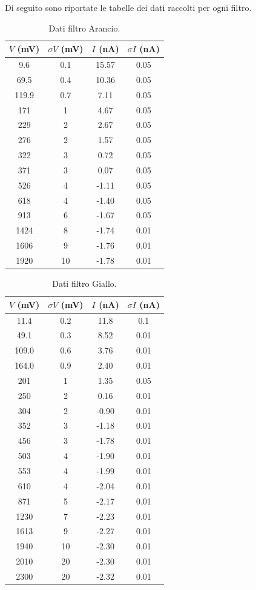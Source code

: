 \documentclass[10pt,a4paper]{article}
\begin{document}
Di seguito sono riportate le tabelle dei dati raccolti per ogni filtro. %
\\

\begin{table}[!htb]\centering
\begin{tabular}{|c|c|c|c|}
\hline
$V$ (mV) & $\sigma V$ (mV) & $I$ (nA) & $\sigma I$ (nA)\\
\hline
9.6 & 0.1 & 15.57 & 0.05\\
69.5 & 0.4 & 10.36 & 0.05\\
119.9 & 0.7 & 7.11 & 0.05\\
171 & 1 & 4.67 & 0.05\\
229 & 2 & 2.67 & 0.05\\
276 & 2 & 1.57 & 0.05\\
322 & 3 & 0.72 & 0.05\\
371 & 3 & 0.07 & 0.05\\
526 & 4 & -1.11 & 0.05\\
618 & 4 & -1.40 & 0.05\\
913 & 6 & -1.67 & 0.05\\
1424 & 8 & -1.74 & 0.01\\
1606 & 9 & -1.76 & 0.01\\
1920 & 10 & -1.78 & 0.01\\
\hline
\end{tabular}
\caption{Dati filtro Arancio.}
\end{table}


\begin{table}[!htb]\centering
\begin{tabular}{|c|c|c|c|}
\hline
$V$ (mV) & $\sigma V$ (mV) & $I$ (nA) & $\sigma I$ (nA)\\
\hline
11.4 & 0.2 & 11.8 & 0.1\\
49.1 & 0.3 & 8.52 & 0.01\\
109.0 & 0.6 & 3.76 & 0.01\\
164.0 & 0.9 & 2.40 & 0.01\\
201 & 1 & 1.35 & 0.05\\
250 & 2 & 0.16 & 0.01\\
304 & 2 & -0.90 & 0.01\\
352 & 3 & -1.18 & 0.01\\
456 & 3 & -1.78 & 0.01\\
503 & 4 & -1.90 & 0.01\\
553 & 4 & -1.99 & 0.01\\
610 & 4 & -2.04 & 0.01\\
871 & 5 & -2.17 & 0.01\\
1230 & 7 & -2.23 & 0.01\\
1613 & 9 & -2.27 & 0.01\\
1940 & 10 & -2.30 & 0.01\\
2010 & 20 & -2.30 & 0.01\\
2300 & 20 & -2.32 & 0.01\\
\hline
\end{tabular}
\caption{Dati filtro Giallo.}
\end{table}
\end{document}
